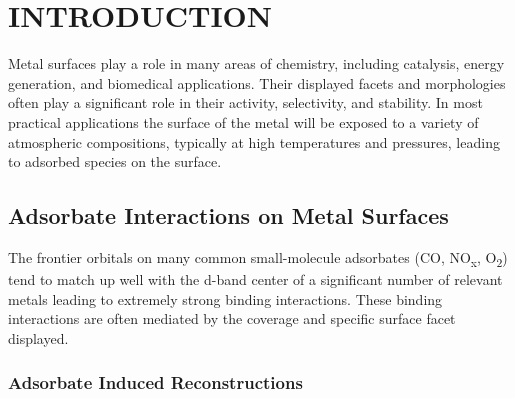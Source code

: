 \documentclass[draft]{nddiss2e}
\begin{document}
\mainmatter

\chapter{INTRODUCTION}
Metal surfaces play a role in many areas of chemistry, including catalysis,
energy generation, and biomedical applications. Their displayed facets and
morphologies often play a significant role in their activity, selectivity, and
stability. In most practical applications the surface of the metal will be
exposed to a variety of atmospheric compositions, typically at high
temperatures and pressures, leading to adsorbed species on the surface. 

\section{Adsorbate Interactions on Metal Surfaces}
The frontier orbitals on many common small-molecule adsorbates (CO,
NO\textsubscript{x}, O\textsubscript{2}) tend to match up well with the d-band
center of a significant number of relevant metals leading to extremely strong
binding interactions. These binding interactions are often mediated by the
coverage and specific surface facet displayed.


\subsection{Adsorbate Induced Reconstructions}
\end{document}
